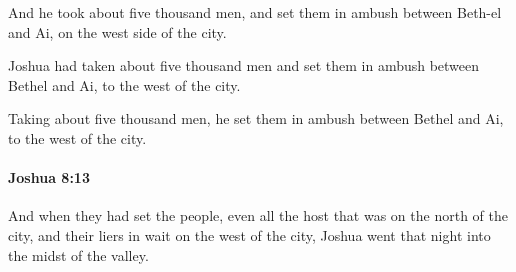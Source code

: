 			\begin{versebox}
					\item[BHS] 
					\item[ASV] And he took about five thousand men, and set them in ambush between Beth-el and Ai, on the west side of the city.
					\item[NIV] Joshua had taken about five thousand men and set them in ambush between Bethel and Ai, to the west of the city.
					\item[NRSV] Taking about five thousand men, he set them in ambush between Bethel and Ai, to the west of the city.
			\end{versebox}

		\paragraph{Joshua 8:13} %
			\label{JOSHUA-8-13}

			And when they had set the people, even all the host that was on the north of the city, and their liers in wait on the west of the city, Joshua went that night into the midst of the valley.

